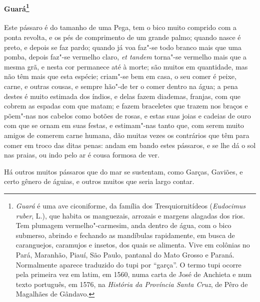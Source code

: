 \paragraph{Guará\footnote{ \textit{Guará} é uma ave ciconiforme, da
família dos Tresquiornitídeos (\textit{Eudocimus ruber}, L.), que
habita os manguezais, arrozais e margens alagadas dos rios. Tem
plumagem vermelho"-carmesim, anda dentro de água, com o bico submerso,
abrindo e fechando as mandíbulas rapidamente, em busca de caranguejos,
caramujos e insetos, dos quais se alimenta. Vive em colônias no Pará,
Maranhão, Piauí, São Paulo, pantanal do Mato Grosso e Paraná.
Normalmente aparece traduzido do tupi por ``garça''. O termo tupi ocorre
pela primeira vez em latim, em 1560, numa carta de José de
Anchieta e num texto português, em 1576, na \textit{História da
Província Santa Cruz}, de Pêro de Magalhães de Gândavo.}} Este
pássaro é do tamanho de uma Pega, tem o bico muito comprido com a ponta
revolta, e os pés de comprimento de um grande palmo; quando nasce é
preto, e depois se faz pardo; quando já voa faz"-se todo branco mais que
uma pomba, depois faz"-se vermelho claro, \textit{et tandem} torna"-se vermelho mais que a mesma grã, e
nesta cor permanece até à morte; são muitos em quantidade, mas não têm 
mais que esta espécie; criam"-se bem em casa, o seu comer é peixe,
carne, e outras cousas, e sempre hão"-de ter o comer dentro na água; a
pena destes é muito estimada dos índios, e delas fazem diademas,
franjas, com que cobrem as espadas com que matam; e fazem braceletes
que trazem nos braços e põem"-nas nos cabelos como botões de rosas, e
estas suas joias e cadeias de ouro com que se ornam em suas festas, e 
estimam"-nas tanto que, com serem muito amigos de comerem carne humana,
dão muitas vezes os contrários que têm para comer em troco das ditas 
penas: andam em bando estes pássaros, e se lhe dá o sol nas praias, ou
indo pelo ar é cousa formosa de ver.

 Há outros muitos pássaros que do mar se sustentam, como Garças,
Gaviões, e certo gênero de águias, e outros muitos que seria largo contar.

